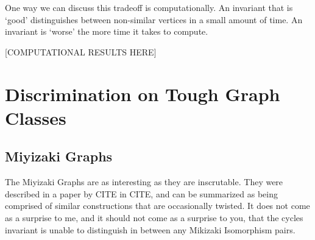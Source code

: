 One way we can discuss this tradeoff is computationally.
An invariant that is `good' distinguishes between non-similar vertices in a small amount of time.
An invariant is `worse' the more time it takes to compute.

[COMPUTATIONAL RESULTS HERE] 

%
%
%

\section{Discrimination on Tough Graph Classes}

\subsection{Miyizaki Graphs}
The Miyizaki Graphs are as interesting as they are inscrutable.
They were described in a paper by CITE in CITE, and can be summarized as being comprised of similar constructions that are occasionally twisted.
It does not come as a surprise to me, and it should not come as a surprise to you, that the cycles invariant is unable to distinguish in between any Mikizaki Isomorphism pairs.

